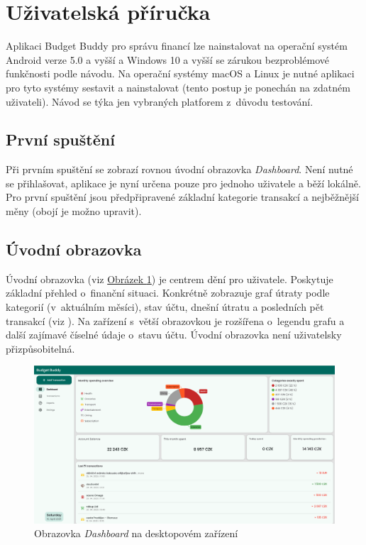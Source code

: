 \documentclass[
  biblatex,
  figures=true,
  tables=false,
  glossaries,
  index
]{kidiplom}
\begin{document}
\section{Uživatelská příručka}
Aplikaci Budget Buddy pro správu financí lze nainstalovat na operační systém Android verze 5.0 a vyšší a Windows 10 a vyšší se zárukou bezproblémové funkčnosti podle návodu. Na operační systémy macOS a Linux je nutné aplikaci pro tyto systémy sestavit a nainstalovat (tento postup je ponechán na zdatném uživateli). Návod se týka jen vybraných platforem z~důvodu testování. 

\subsection{První spuštění}
Při prvním spuštění se zobrazí rovnou úvodní obrazovka \textit{Dashboard}. Není nutné se přihlašovat, aplikace je nyní určena pouze pro jednoho uživatele a běží lokálně. Pro první spuštění jsou předpřipravené základní kategorie transakcí a nejběžnější měny (obojí je možno upravit). 

\subsection{Úvodní obrazovka}
Úvodní obrazovka (viz \hyperref[fig:dashboard-large]{Obrázek \ref{fig:dashboard-large}}) je centrem dění pro uživatele. Poskytuje základní přehled o~finanční situaci. Konkrétně zobrazuje graf útraty podle kategorií (v~aktuálním měsíci), stav účtu, dnešní útratu a posledních pět transakcí (viz ). Na zařízení s~větší obrazovkou je rozšířena o~legendu grafu a další zajímavé číselné údaje o~stavu účtu. Úvodní obrazovka není uživatelsky přizpůsobitelná.

\begin{figure}
  \centering
  \includegraphics[width=\textwidth]{images/dashboard-large.png}
  \caption{Obrazovka \textit{Dashboard} na desktopovém zařízení}
  \label{fig:dashboard-large}
\end{figure}
\end{document}
